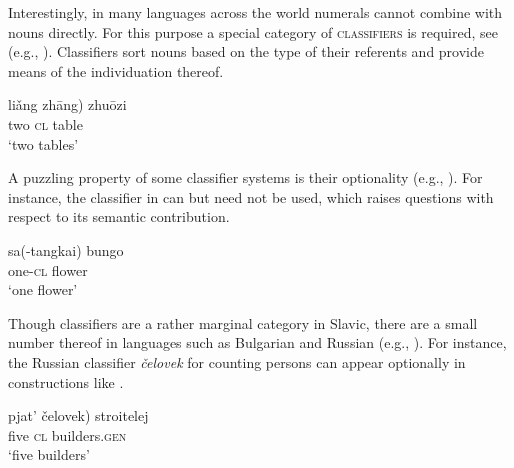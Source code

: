 \documentclass[output=paper]{langscibook}
\begin{document}
\ea\label{doc-wag:ex:ignorance}
\z 
\z 


\noindent Interestingly, in many languages across the world numerals cannot combine with nouns directly. For this purpose a special category of \textsc{classifiers} is required, see  (e.g., \citealt{aikhenvald2000classifiers, bale_coon2014classifiers}). Classifiers sort nouns based on the type of their referents and provide means of the individuation thereof.
 
\ea \gll liǎng \minsp{*(} zhāng) zhuōzi\\
two {} \textsc{cl} table\\
\glt `two tables' \hfill \citep[Mandarin Chinese;][695]{bale_coon2014classifiers}\label{doc-wag:ex:classifier}
\z

\noindent A puzzling property of some classifier systems is their optionality (e.g., ). For instance, the classifier in   can but need not be used, which raises questions with respect to its semantic contribution.

\ea \gll sa(-tangkai) bungo\\
one-\textsc{cl} flower\\
\glt `one flower' \hfill \citep[Minangkabau, Malayic;][190, adapted]{aikhenvald2000classifiers}\label{doc-wag:ex:optional-classifier}
\z

\noindent Though classifiers are a rather marginal category in Slavic, there are a small number thereof in languages such as Bulgarian and Russian (e.g., \citealt{cinque_krapova2007note, khrizman2016functional}). For instance, the Russian classifier \textit{čelovek} for counting persons can appear optionally in constructions like . %

\ea \gll pjat' \minsp{(} čelovek) stroitelej\\
five {} \textsc{cl} builders\textsc{.gen}\\
\glt `five builders' \hfill \citep[Russian;][4, adapted]{khrizman2016functional}\label{doc-wag:ex:classifier-russian}
\z
\end{document}
